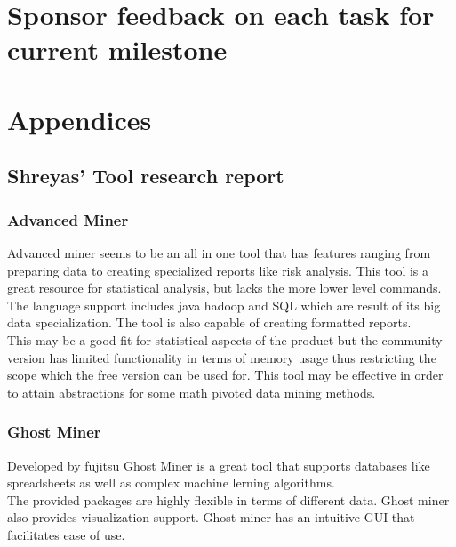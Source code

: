 \documentclass[12pt]{article}
\begin{document}
	\section{Sponsor feedback on each task for current milestone}
	\pagebreak
	\section{Appendices}
	\subsection{Shreyas' Tool research report} \label{app_shr}
	\subsubsection{Advanced Miner} \label{adv}
	Advanced miner seems to be an all in one tool that has features ranging from preparing data to creating specialized reports like risk analysis. This tool is a great resource for statistical analysis, but lacks the more lower level commands. \\
	The language support includes java hadoop and SQL which are result of its big data specialization. The tool is also capable of creating formatted reports.\\
	This may be a good fit for statistical aspects of the product but the community version has limited functionality in terms of memory usage thus restricting the scope which the free version can be used for. This tool may be effective in order to attain abstractions for some math pivoted data mining methods.
	\subsubsection{Ghost Miner} \label{ghstm}
	Developed by fujitsu Ghost Miner is a great tool that supports databases like spreadsheets as well as complex machine lerning algorithms. \\
	The provided packages are highly flexible in terms of different data. Ghost miner also provides visualization support. Ghost miner has an intuitive GUI that facilitates ease of use.
\end{document}
